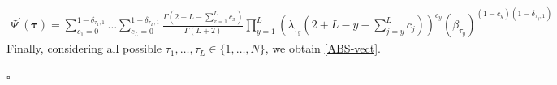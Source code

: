 \documentclass[10pt]{article}
\numberwithin{equation}{section}
\numberwithin{equation}{subsection}
\begin{document}
\begin{equation}\label{elementsABS}
	\begin{split}
		\Psi^{'}(\bm{\tau})=\sum_{c_{1}=0}^{1-\delta_{\tau_{1},1}}\ldots\sum_{c_{L}=0}^{1-\delta_{\tau_{L},1}}\frac{\Gamma(2+L-\sum_{x=1}^{L}c_{x})}{\Gamma(L+2)}\prod_{y=1}^{L}\left(\lambda_{\tau_{y}}\left(2+L-y-\sum_{j=y}^{L}c_{j}\right)\right)^{c_{y}}\left(\beta_{\tau_{y}}\right)^{(1-c_{y})(1-\delta_{\tau_{y},1})}
	\end{split}
\end{equation} 
Finally, considering all possible $\tau_{1},\ldots,\tau_{L}\in \{1,\ldots,N\}$, we obtain \eqref{ABS-vect}.
\begin{flushright}
    $\square$
\end{flushright}
\end{document}
